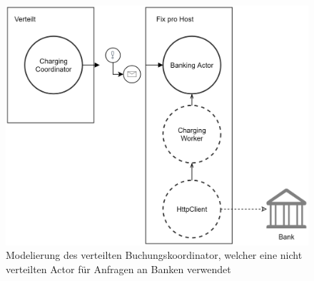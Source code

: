 \begin{figure}
    \centering
    \includegraphics[width=0.65\linewidth]{gfx/implementation/ChargingCoordinatorSample}
    \caption{Modelierung des verteilten Buchungskoordinator, welcher eine nicht verteilten Actor für Anfragen an Banken verwendet}
    \label{fig:implementation:ChargingCoordinatorSample}
\end{figure}


